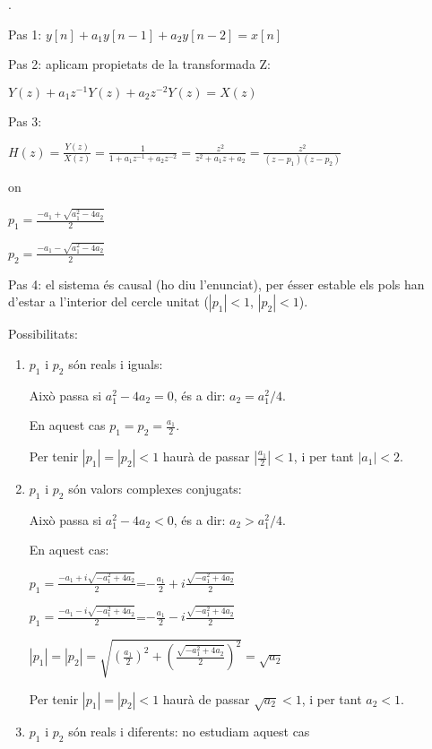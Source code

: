 \documentclass{article}
\begin{document}
.

\begin{description}
\item{Pas 1:}
$
\displaystyle
y[n]+a_1 y[n-1]+a_2 y[n-2] = x[n]
$

\item{Pas 2:} aplicam propietats de la transformada Z:

$
\displaystyle
Y(z)+a_1 z^{-1} Y(z)+a_2 z^{-2} Y(z) = X(z)
$

\item{Pas 3:}

$
\displaystyle
H(z)=\frac{Y(z)}{X(z)}=\frac{1}{1+a_1z^{-1}+a_2z^{-2}}=\frac{z^2}{z^2+a_1z+a_2}=\frac{z^2}{(z-p_1)(z-p_2)}
$

on

$\displaystyle p_1=\frac{-a_1 + \sqrt{a_1^2 - 4a_2}}{2}$

$\displaystyle p_2=\frac{-a_1 -  \sqrt{a_1^2 - 4a_2}}{2}$



\item{Pas 4:} el sistema és causal (ho diu l'enunciat), per ésser estable els pols han d'estar
a l'interior del cercle unitat ($|p_1| < 1$, $|p_2| < 1$).

Possibilitats:

\begin{enumerate}
\item $p_1$ i $p_2$ són reals i iguals: 

Això passa si $a_1^2 - 4a_2=0$, és a dir: $a_2=a_1^2/4$.

En aquest cas $p_1=p_2=\frac{a_1}{2}$.

Per tenir $|p_1|=|p_2| < 1$ haurà de passar $|\frac{a_1}{2}|<1$, i per tant $|a_1|<2$.

\item $p_1$ i $p_2$ són valors complexes conjugats: 

Això passa si $a_1^2 - 4a_2<0$, és a dir: $a_2 > a_1^2/4$.

En aquest cas:

$\displaystyle p_1=\frac{-a_1 + i \sqrt{-a_1^2 + 4a_2}}{2}$=$-\frac{a_1}{2} + i \frac{\sqrt{-a_1^2 + 4a_2}}{2} $

$\displaystyle p_1=\frac{-a_1 - i \sqrt{-a_1^2 + 4a_2}}{2}$=$-\frac{a_1}{2} - i \frac{\sqrt{-a_1^2 + 4a_2}}{2} $


$\displaystyle |p_1| = |p_2|=\sqrt{  \left( \frac{a_1}{2} \right)^2 + \left( \frac{\sqrt{-a_1^2 + 4a_2}}{2} \right)^2 }  = \sqrt{a_2} $

Per tenir $|p_1|=|p_2| < 1$ haurà de passar $\sqrt{a_2}<1$, i per tant $a_2<1$.


\item $p_1$ i $p_2$ són reals i diferents: no estudiam aquest cas


\end{enumerate}



\end{description}
\end{document}
